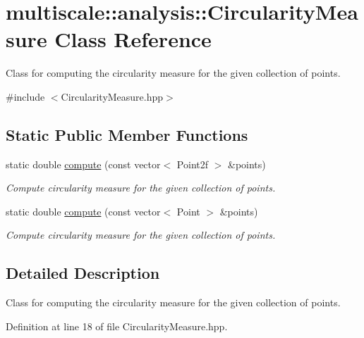 \hypertarget{classmultiscale_1_1analysis_1_1CircularityMeasure}{\section{multiscale\-:\-:analysis\-:\-:\-Circularity\-Measure \-Class \-Reference}
\label{classmultiscale_1_1analysis_1_1CircularityMeasure}
}


\-Class for computing the circularity measure for the given collection of points.  




{\ttfamily \#include $<$\-Circularity\-Measure.\-hpp$>$}

\subsection*{\-Static \-Public \-Member \-Functions}
\begin{DoxyCompactItemize}
\item 
static double \hyperlink{classmultiscale_1_1analysis_1_1CircularityMeasure_a819f1b1f9d7cdd96de2a6d9c5b6c6caa}{compute} (const vector$<$ \-Point2f $>$ \&points)
\begin{DoxyCompactList}\small\item\em \-Compute circularity measure for the given collection of points. \end{DoxyCompactList}\item 
static double \hyperlink{classmultiscale_1_1analysis_1_1CircularityMeasure_a252830f574cd4a85f108f74265520a8f}{compute} (const vector$<$ \-Point $>$ \&points)
\begin{DoxyCompactList}\small\item\em \-Compute circularity measure for the given collection of points. \end{DoxyCompactList}\end{DoxyCompactItemize}


\subsection{\-Detailed \-Description}
\-Class for computing the circularity measure for the given collection of points. 

\-Definition at line 18 of file \-Circularity\-Measure.\-hpp.



